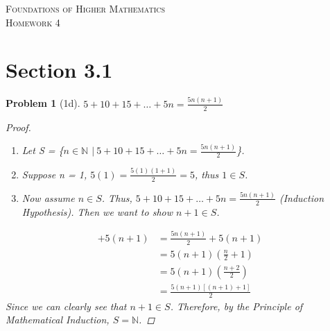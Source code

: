 \documentclass{article}
\theoremstyle{problem}
\newtheorem{prob}{Problem}
\theoremstyle{plain}
\begin{document}
\begin{center}
\textsc{\Large Foundations of Higher Mathematics}\\[.3cm]
\textsc{\Large Homework 4}
\end{center}


\section*{Section 3.1}
\begin{prob}[1d]
  $5 + 10 + 15 + \ldots + 5n = \frac{5n(n + 1)}{2}$
  \begin{proof}\
    \begin{enumerate}      
    \item Let S = \{$n \in \mathbb{N}$ $|\ 5 + 10 + 15 + \ldots + 5n = \frac{5n(n + 1)}{2}$\}.
    \item Suppose n = 1, $5(1) = \frac{5(1)(1 + 1)}{2} = 5$, thus $1 \in S$.
    \item Now assume $n \in S$. Thus, $5 + 10 + 15 + \ldots + 5n = \frac{5n(n + 1)}{2}$ (Induction Hypothesis). Then we want to show $n + 1 \in S$.
    \end{enumerate}    
    \begin{align*}
      [5 + 10 + 15 + \ldots + 5n] + 5(n + 1) &= \frac{5n(n + 1)}{2} + 5(n + 1) \tag*{(Induction hypothesis)}\\
      &= 5(n + 1)(\frac{n}{2} + 1)\\
      &= 5(n + 1)(\frac{n + 2}{2})\\
      &= \frac{5(n + 1)[(n+1) + 1]}{2}
    \end{align*}
    Since we can clearly see that $n + 1 \in S$. Therefore, by the Principle of Mathematical Induction, $S = \mathbb{N}$.
  \end{proof}

  \end{prob}
\end{document}
